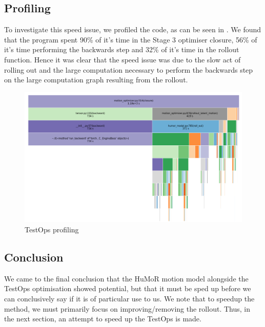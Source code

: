 \subsection{Profiling}
To investigate this speed issue, we profiled the code, as can be seen in . We found that the program spent 90\% of it's time in the Stage 3 optimiser closure, 56\% of it's time performing the backwards step and 32\% of it's time in the rollout function. Hence it was clear that the speed issue was due to the slow act of rolling out and the large computation necessary to perform the backwards step on the large computation graph resulting from the rollout.

\begin{figure}[!ht]
    \centering
    \includegraphics[width=1\textwidth]{Figures/humor/profiling/profiling.png}
    \caption{TestOps profiling}
    \label{fig:humor_profiling}
\end{figure}

\subsection{Conclusion}
We came to the final conclusion that the HuMoR motion model alongside the TestOps optimisation showed potential, but that it must be sped up before we can conclusively say if it is of particular use to us. We note that to speedup the method, we must primarily focus on improving/removing the rollout. Thus, in the next section, an attempt to speed up the TestOps is made.
